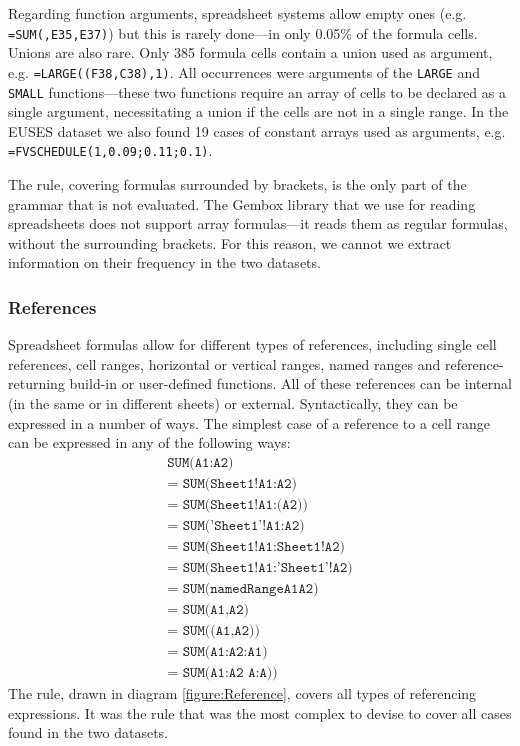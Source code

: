 \documentclass[conference]{IEEEtran}
\begin{document}
Regarding function arguments, spreadsheet systems allow empty ones (e.g. \texttt{=SUM(,E35,E37)}) but this is rarely done---in only 0.05\% of the formula cells. Unions are also rare. Only 385 formula cells contain a union used as argument, e.g. \texttt{=LARGE((F38,C38),1)}. All occurrences were arguments of the \texttt{LARGE} and \texttt{SMALL} functions---these two functions require an array of cells to be declared as a single argument, necessitating a union if the cells are not in a single range. In the EUSES dataset we also found 19 cases of constant arrays used as arguments, e.g. \texttt{=FVSCHEDULE(1,{0.09;0.11;0.1})}.

The  rule, covering formulas surrounded by brackets, is the only part of the grammar that is not evaluated. The Gembox library that we use for reading spreadsheets does not support array formulas---it reads them as regular formulas, without the surrounding brackets. For this reason, we cannot we extract information on their frequency in the two datasets.

\subsubsection{References}

Spreadsheet formulas allow for different types of references, including single cell references, cell ranges, horizontal or vertical ranges, named ranges and reference-returning build-in or user-defined functions. All of these references can be internal (in the same or in different sheets) or external. Syntactically, they can be expressed in a number of ways. The simplest case of a reference to a cell range can be expressed in any of the following ways:
\begin{align}
	\texttt{SUM(A1:A2)} \\ 
	\texttt{= SUM(Sheet1!A1:A2)} \\
	\texttt{= SUM(Sheet1!A1:(A2))} \\
	\texttt{= SUM('Sheet1'!A1:A2)} \\
	\texttt{= SUM(Sheet1!A1:Sheet1!A2)} \\
	\texttt{= SUM(Sheet1!A1:'Sheet1'!A2)} \\
	\texttt{= SUM(namedRangeA1A2)} \\ 
	\texttt{= SUM(A1,A2)} \\ 
	\texttt{= SUM((A1,A2))} \\ 
	\texttt{= SUM(A1:A2:A1)} \\
	\texttt{= SUM(A1:A2 A:A))} 
\end{align}
The  rule, drawn in diagram \ref{figure:Reference}, covers all types of referencing expressions. It was the rule that was the most complex to devise to cover all cases found in the two datasets.
\end{document}
